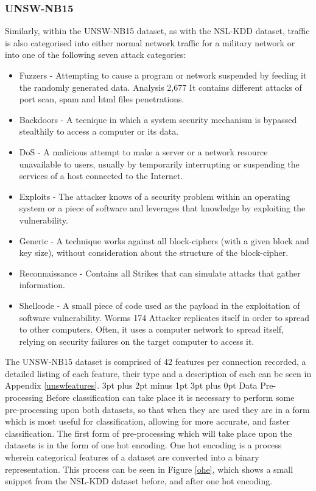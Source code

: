 \documentclass[12pt,a4paper]{article}
\makeatletter
\renewcommand\subsection{\@startsection {subsection}{1}{2mm} %
      {3pt plus 2pt minus 1pt} %
      {3pt plus 0pt} %
      {\normalfont\bfseries}}
\makeatother
\begin{document}
\subsubsection{UNSW-NB15}
Similarly, within the UNSW-NB15 dataset, as with the NSL-KDD dataset, traffic is also categorised into either normal network traffic for a military network or into one of the following seven attack categories:
\begin{itemize}
	\item{Fuzzers - Attempting to cause a program or network suspended by feeding it the randomly generated data. Analysis 2,677 It contains different attacks of port scan, spam and html files penetrations.}
	\item{Backdoors - A tecnique in which a system security mechanism is bypassed stealthily to access a computer or its data.}
	\item{DoS - A malicious attempt to make a server or a network resource unavailable to users, usually by temporarily interrupting or suspending the services of a host connected to the Internet.}
	\item{Exploits - The attacker knows of a security problem within an operating system or a piece of software and leverages that knowledge by exploiting the vulnerability.}
	\item{Generic - A technique works against all block-ciphers (with a given block and key size), without consideration about the structure of the block-cipher.}
	\item{Reconnaissance - Contains all Strikes that can simulate attacks that gather information.}
	\item{Shellcode - A small piece of code used as the payload in the exploitation of software vulnerability. Worms 174 Attacker replicates itself in order to spread to other computers. Often, it uses a computer network to spread itself, relying on security failures on the target computer to access it.}
\end{itemize}

	The UNSW-NB15 dataset is comprised of 42 features per connection recorded, a detailed listing of each feature, their type and a description of each can be seen in Appendix \ref{unswfeatures}.
\subsection{Data Pre-processing}
Before classification can take place it is necessary to perform some pre-processing upon both datasets, so that when they are used they are in a form which is most useful for classification, allowing for more accurate, and faster classification. The first form of pre-processing which will take place upon the datasets is in the form of one hot encoding. One hot encoding is a process wherein categorical features of a dataset are converted into a binary representation. This process can be seen in Figure \ref{ohe}, which shows a small snippet from the NSL-KDD dataset before, and after one hot encoding.
\end{document}
